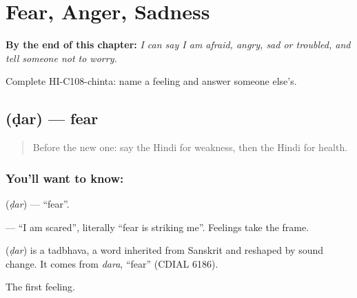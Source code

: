 
\chapter{Fear, Anger, Sadness}
\label{ch:hi-fear-anger-sadness}

\begin{chapteropening}
\textbf{By the end of this chapter:} \emph{I can say I am afraid, angry, sad or troubled, and tell someone not to worry.}

Complete HI-C108-chinta: name a feeling and answer someone else's.
\end{chapteropening}

\section[\texorpdfstring{\hi{डर} (ḍar)}{डर (ḍar)}]{ (ḍar) — fear}

\label{lesson:HI-C108-dar}



\begin{quote}
Before the new one: say the Hindi for weakness, then the Hindi for health.
\end{quote}

\subsection*{You'll want to know: }
\textbf{} (\emph{ḍar}) — \textquotedblleft{}fear\textquotedblright{}.

\textbf{    } — \textquotedblleft{}I am scared\textquotedblright{}, literally \textquotedblleft{}fear is striking me\textquotedblright{}. Feelings take the \textbf{} frame.

\begin{cousinweb}
\textbf{} (\emph{ḍar}) is a tadbhava, a word inherited from Sanskrit and reshaped by sound change. It comes from \emph{dara}, \textquotedblleft{}fear\textquotedblright{} (CDIAL 6186).
\end{cousinweb}

\begin{grammarlens}[title={What you've built}]
The first feeling.
\end{grammarlens}

